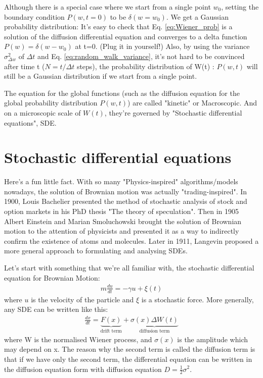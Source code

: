 \documentclass{report}
\begin{document}
Although there is a special case where we start from a single point $w_0$, setting the boundary condition $P(w,t=0)$ to be $\delta(w=w_0)$. We get a Gaussian probability distribution:
It's easy to check that Eq. \eqref{eq:Wiener_prob} is a solution of the diffusion differential equation and converges to a delta function $P(w) = \delta(w-w_0)$ at t=0. (Plug it in yourself!) Also, by using the variance $\sigma_{\Delta w}^2$ of $\Delta t$ and Eq. \eqref{eq:random_walk_variance}, it's not hard to be convinced after time t ($N = t/\Delta t$ steps), the probability distribution of W(t) : $P(w,t)$ will still be a Gaussian distribution if we start from a single point.

The equation for the global functions (such as the diffusion equation for the global probability distribution $P(w,t)$) are called "kinetic" or Macroscopic. And on a microscopic scale of $W(t)$, they're governed by "Stochastic differential equations", SDE.
\section{Stochastic differential equations}
Here's a fun little fact. With so many "Physics-inspired" algorithms/models nowadays, the solution of Brownian motion was actually "trading-inspired". In 1900, Louis Bachelier presented the method of stochastic analysis of stock and option markets in his PhD thesis "The theory of speculation". Then in 1905 Albert Einstein and Marian Smoluchowski brought the solution of Brownian motion to the attention of physicists and presented it as a way to indirectly confirm the existence of atoms and molecules. Later in 1911, Langevin proposed a more general approach to formulating and analysing SDEs.

Let's start with something that we're all familiar with, the stochastic differential equation for Brownian Motion:
\begin{align}
    m \frac{d u}{d t}=-\gamma u+\xi(t)
\end{align}
where $u$ is the velocity of the particle and $\xi$ is a stochastic force. More generally, any SDE can be written like this:
\begin{align}
    \frac{d x}{d t}=\underbrace{F(x)}_{\text{drift term}}+\underbrace{\sigma(x) \Delta W(t)}_{\text{diffusion term}}
\end{align}
where W is the normalised Wiener process, and $\sigma(x)$ is the amplitude which may depend on x. The reason why the second term is called the diffusion term is that if we have only the second term, the differential equation can be written in the diffusion equation form with diffusion equation $D = \frac{1}{2} \sigma^2$.
\end{document}
